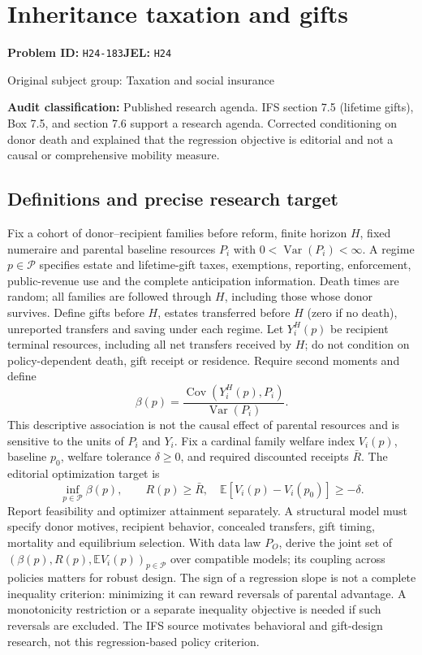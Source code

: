 \documentclass[11pt,a4paper]{article}
\begin{document}
\section*{Inheritance taxation and gifts}
\textbf{Problem ID:} \texttt{H24-183}\quad \textbf{JEL:} \texttt{H24}\par
\label{problem:OP-0473}
{\sffamily\small\color{muted}Original subject group: Taxation and social insurance\par}
\label{definitions:problem:30007755}
\textbf{Audit classification:} Published research agenda. IFS section 7.5 (lifetime gifts), Box 7.5, and section 7.6 support a research agenda. Corrected conditioning on donor death and explained that the regression objective is editorial and not a causal or comprehensive mobility measure.
\subsection*{Definitions and precise research target}
Fix a cohort of donor--recipient families before reform, finite horizon \(H\), fixed numeraire and parental baseline resources \(P_i\) with \(0<\operatorname{Var}(P_i)<\infty\). A regime \(p\in\mathcal P\) specifies estate and lifetime-gift taxes, exemptions, reporting, enforcement, public-revenue use and the complete anticipation information. Death times are random; all families are followed through \(H\), including those whose donor survives. Define gifts before \(H\), estates transferred before \(H\) (zero if no death), unreported transfers and saving under each regime. Let \(Y_i^H(p)\) be recipient terminal resources, including all net transfers received by \(H\); do not condition on policy-dependent death, gift receipt or residence. Require second moments and define
\[
 \beta(p)=\frac{\operatorname{Cov}(Y_i^H(p),P_i)}{\operatorname{Var}(P_i)}.
\]
This descriptive association is not the causal effect of parental resources and is sensitive to the units of \(P_i\) and \(Y_i\). Fix a cardinal family welfare index \(V_i(p)\), baseline \(p_0\), welfare tolerance \(\delta\geq0\), and required discounted receipts \(\bar R\). The editorial optimization target is
\[
 \inf_{p\in\mathcal P}\beta(p),\qquad
 R(p)\geq\bar R,\quad \mathbb E[V_i(p)-V_i(p_0)]\geq-\delta.
\]
Report feasibility and optimizer attainment separately. A structural model must specify donor motives, recipient behavior, concealed transfers, gift timing, mortality and equilibrium selection. With data law \(P_O\), derive the joint set of \((\beta(p),R(p),\mathbb EV_i(p))_{p\in\mathcal P}\) over compatible models; its coupling across policies matters for robust design. The sign of a regression slope is not a complete inequality criterion: minimizing it can reward reversals of parental advantage. A monotonicity restriction or a separate inequality objective is needed if such reversals are excluded. The IFS source motivates behavioral and gift-design research, not this regression-based policy criterion.
\end{document}
